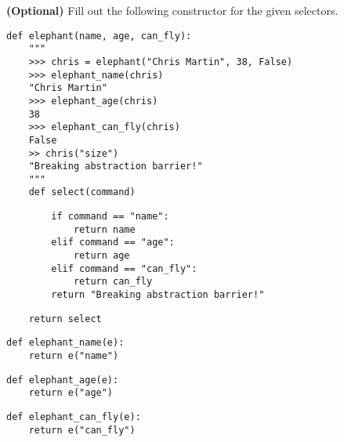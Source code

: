 \begin{blocksection}
\question \textbf{(Optional)} Fill out the following constructor for the given
selectors.

\begin{lstlisting}
def elephant(name, age, can_fly):
    """
    >>> chris = elephant("Chris Martin", 38, False)
    >>> elephant_name(chris)
    "Chris Martin"
    >>> elephant_age(chris)
    38
    >>> elephant_can_fly(chris)
    False
    >> chris("size")
    "Breaking abstraction barrier!"
    """
    def select(command)
\end{lstlisting}
\begin{solution}[1.8in]
\begin{lstlisting}
        if command == "name":
            return name
        elif command == "age":
            return age
        elif command == "can_fly":
            return can_fly
        return "Breaking abstraction barrier!"
\end{lstlisting}
\end{solution}

\begin{lstlisting}
    return select
\end{lstlisting}

\begin{lstlisting}
def elephant_name(e):
    return e("name")
\end{lstlisting}

\begin{lstlisting}
def elephant_age(e):
    return e("age")
\end{lstlisting}

\begin{lstlisting}
def elephant_can_fly(e):
    return e("can_fly")
\end{lstlisting}

\end{blocksection}

